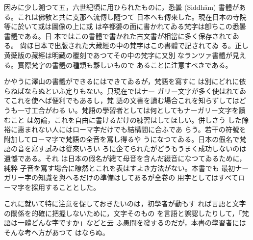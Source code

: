 \numberParagraph
因みに少し溯つて五，六世紀頃に用ひられたものに，悉曇
(Siddhām) 書體がある。これは佛敎と共に支那へ流傳し隨つて
日本へも傳來した。現在日本の寺院等に於いて或は圖像の上に或
は卒都婆の面に書かれてゐる梵字は卽ちこの悉曇書體である。日
本ではこの書體で書かれた古文書が相當に多く保存されてゐる。
尙ほ日本で出版された大藏經の中の梵字はこの書體で記されてゐ
る。正し黄蘗版の藏經は明藏の覆刻であつてその中の梵字に又別
なランツァ書體が見える。實際梵字の書體の種類も夥しいもので
あることに注意すべきである。

かやうに澤山の書體ができるにはできてゐるが，梵語を寫すに
は別にどれに依らねばならぬといふ定りもない。只現在ではナー
ガリー文字が多く使はれてゐてこれを使へば便利でもあるし，梵
語の文書を讀む場合これを知らずしてはどうも一寸工合がわる
い。梵語の學習者としては何としてもナーガリー文字を讀むこと
は勿論，これを自由に書けるだけの練習はしてほしい。併しさう
した餘裕に惠まれない人にはローマ字だけでも結構間に合ふであ
らう。若干の符號を附加してローマ字で梵語の全音を寫し得るや
うになつてゐる。日本の假名で梵語の音を寫す試みは從來いろい
ろに企てられたがどうもうまく成功しないのは遺憾である。それ
は日本の假名が總て母音を含んだ綴音になつてゐるために，純粹
子音を寫す場合に瞭然とこれを表はすよき方法がない。本書でも
最初ナーガリー字の知識を與へるだけの準備はしてあるが全卷の
用字としてはすべてローマ字を採用することとした。

これに就いて特に注意を促しておきたいのは，初學者が動もす
れば言語と文字の關係を的確に把握しないために，文字そのもの
を言語と誤認したりして，「梵語は一體どんな字ですか」などと云
ふ愚問を發するのだが，本書の學習者にはそんな考へ方があつて
はならぬ。

